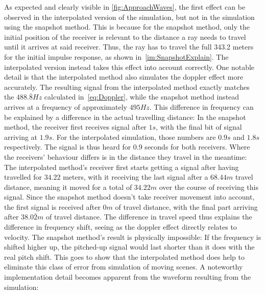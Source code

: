 As expected and clearly visible in \autoref{fig:ApproachWaves}, the first effect can be observed in the interpolated version of the simulation,
but not in the simulation using the snapshot method.
This is because for the snapshot method,
only the initial position of the receiver is relevant to the distance a ray needs to travel until it arrives at said receiver.
Thus, the ray has to travel the full 343.2 meters for the initial impulse response, as shown in~\autoref{im:SnapshotExplain}.
The interpolated version instead takes this effect into account correctly.
\newline
One notable detail is that the interpolated method also simulates the doppler effect more accurately.
The resulting signal from the interpolated method exactly matches the \(488.\bar{8} Hz\) calculated in~\eqref{eq:Doppler},
while the snapshot method instead arrives at a frequency of approximately \(495 Hz\).
\newline
This difference in frequency can be explained by a difference in the actual travelling distance:
In the snapshot method, the receiver first receives signal after \(1s\),
with the final bit of signal arriving at \(1.9s\).
For the interpolated simulation, those numbers are \(0.9s\) and \(1.8s\) respectively.
The signal is thus heard for 0.9 seconds for both receivers.
\newline
Where the receivers' behaviour differs is in the distance they travel in the meantime:
The interpolated method's receiver first starts getting a signal after having travelled for \(34.22\) meters,
with it receiving the last signal after a \(68.44m\) travel distance,
meaning it moved for a total of \(34.22m\) over the course of receiving this signal.
Since the snapshot method doesn't take receiver movement into account,
the first signal is received after \(0m\) of travel distance,
with the final part arriving after \(38.0\bar{2}m\) of travel distance.
\newline
The difference in travel speed thus explains the difference in frequency shift,
seeing as the doppler effect directly relates to velocity.
The snapshot method's result is physically impossible:
If the frequency is shifted higher up,
the pitched-up signal would last shorter than it does with the real pitch shift.
\newline
This goes to show that the interpolated method does help to eliminate this class of error from simulation of moving scenes.
\newline
A noteworthy implementation detail becomes apparent from the waveform resulting from the simulation:

